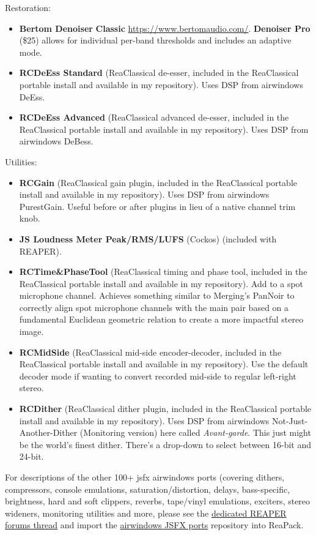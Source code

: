\documentclass[10pt,american]{article}
\begin{document}
Restoration: 
\begin{itemize}
\item \textbf{Bertom Denoiser} \textbf{Classic}
\href{https://www.bertomaudio.com/}{https://www.bertomaudio.com/}.
\textbf{Denoiser Pro} (\$25) allows for individual per-band thresholds and
includes an adaptive mode.
\item \textbf{RCDeEss Standard }(ReaClassical de-esser, included in the
ReaClassical portable install and available in my repository). Uses DSP from
airwindows DeEss.
\item \textbf{RCDeEss Advanced} (ReaClassical advanced de-esser, included in the
ReaClassical portable install and available in my repository). Uses DSP from
airwindows DeBess. 
\end{itemize}
Utilities: 
\begin{itemize}
\item \textbf{RCGain} (ReaClassical gain plugin, included in the ReaClassical
portable install and available in my repository). Uses DSP from airwindows
PurestGain. Useful before or after plugins in lieu of a native channel trim
knob.
\item \textbf{JS Loudness Meter Peak/RMS/LUFS} (Cockos) (included with REAPER). 
\item \textbf{RCTime\&PhaseTool} (ReaClassical timing and phase tool, included
in the ReaClassical portable install and available in my repository). Add to a
spot microphone channel. Achieves something similar to Merging's PanNoir to
correctly align spot microphone channels with the main pair based on a
fundamental Euclidean geometric relation to create a more impactful stereo
image.
\item \textbf{RCMidSide }(ReaClassical mid-side encoder-decoder, included in the
ReaClassical portable install and available in my repository). Use the default
decoder mode if wanting to convert recorded mid-side to regular left-right
stereo.
\item \textbf{RCDither} (ReaClassical dither plugin, included in the
ReaClassical portable install and available in my repository). Uses DSP from
airwindows Not-Just-Another-Dither (Monitoring version) here called
\emph{Avant-garde}. This just might be the world's finest dither. There's a
drop-down to select between 16-bit and 24-bit. 
\end{itemize}
For descriptions of the other 100+ jsfx airwindows ports (covering dithers,
compressors, console emulations, saturation/distortion, delays, bass-specific,
brightness, hard and soft clippers, reverbs, tape/vinyl emulations, exciters,
stereo wideners, monitoring utilities and more, please see the
\href{https://forum.cockos.com/showthread.php?t=275301}{dedicated REAPER forums
thread} and import the
\href{https://github.com/chmaha/airwindows-JSFX-ports/raw/main/index.xml}{airwindows
JSFX ports} repository into ReaPack.\pagebreak{}
\end{document}
